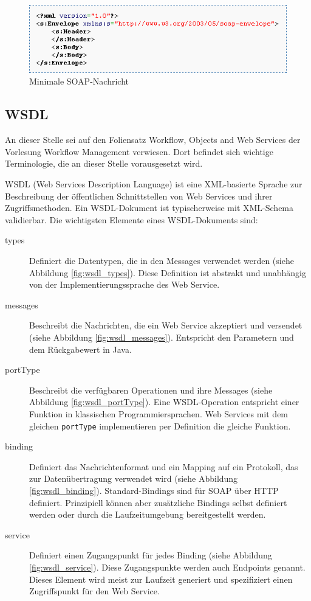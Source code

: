 \documentclass[runningheads]{llncs}
\newcommand{\germanquote}[1]{\glqq{}#1\grqq{}}
\begin{document}
    \begin{figure}[ht!]
      \centering
      \includegraphics[width=\textwidth]{../images/min_soap.png}
      \caption{Minimale SOAP-Nachricht}
      \label{fig:min_soap}
    \end{figure}


  \subsection{WSDL}
  \label{wsdl}
  \nocite{wk_wsdl}
  \nocite{tut_wsdl}
    An dieser Stelle sei auf den Foliensatz \germanquote{Workflow, Objects and Web
    Ser\-vi\-ces}\cite{wfm_ch7} der Vorlesung \germanquote{Workflow Management}\cite{wfm_site}
    verwiesen. Dort befindet sich wichtige Terminologie, die an dieser Stelle vorausgesetzt wird.

    WSDL (Web Services Description Language) ist eine XML-basierte Sprache zur Beschreibung der
    öffentlichen Schnittstellen von Web Services und ihrer Zugriffsmethoden. Ein WSDL-Dokument ist
    typischerweise mit XML-Schema validierbar. Die wichtigsten Elemente eines WSDL-Dokuments sind:
    \begin{description}
      \item[types]
        Definiert die Datentypen, die in den Messages verwendet werden (siehe Abbildung
        \ref{fig:wsdl_types}). Diese Definition ist abstrakt und unabhängig von der
        Implementierungssprache des Web Service.
      \item[messages]
        Beschreibt die Nachrichten, die ein Web Service akzeptiert und versendet (siehe Abbildung
        \ref{fig:wsdl_messages}). Entspricht den Parametern und dem Rückgabewert in Java.
      \item[portType]
        Beschreibt die verfügbaren Operationen und ihre Messages (siehe Abbildung
        \ref{fig:wsdl_portType}). Eine WSDL-Operation entspricht einer Funktion in klassischen
        Programmiersprachen. Web Services mit dem gleichen \texttt{portType} implementieren per
        Definition die gleiche Funktion.
      \item[binding]
        Definiert das Nachrichtenformat und ein Mapping auf ein Protokoll, das zur Datenübertragung
        verwendet wird (siehe Abbildung \ref{fig:wsdl_binding}). Standard-Bindings sind für SOAP
        über HTTP definiert. Prinzipiell können aber zusätzliche Bindings selbst definiert werden
        oder durch die Laufzeitumgebung bereitgestellt werden.
      \item[service]
        Definiert einen Zugangspunkt für jedes Binding (siehe Abbildung \ref{fig:wsdl_service}).
        Diese Zugangspunkte werden auch \germanquote{Endpoints} genannt. Dieses Element wird meist
        zur Laufzeit generiert und spezifiziert einen Zugriffspunkt für den Web Service.
     \end{description}
\end{document}
